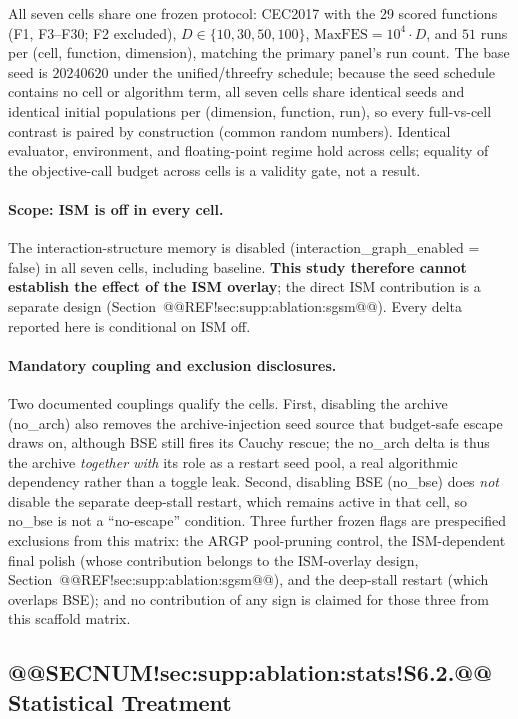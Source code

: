 \documentclass[10pt,a4paper]{article}
\begin{document}
All seven cells share one frozen protocol: CEC2017 with the 29 scored
functions (F1, F3--F30; F2 excluded), $D \in \{10, 30, 50, 100\}$,
$\mathrm{MaxFES} = 10^{4}\cdot D$, and $51$ runs per
(cell, function, dimension), matching the primary panel's run count.  The
base seed is $20240620$ under the unified/threefry schedule; because the seed
schedule contains no cell or algorithm term, all seven cells share identical
seeds and identical initial populations per (dimension, function, run), so
every full-vs-cell contrast is paired by construction (common random
numbers).  Identical evaluator, environment, and floating-point regime hold
across cells; equality of the objective-call budget across cells is a
validity gate, not a result.

\paragraph{Scope: ISM is off in every cell.}
The interaction-structure memory is disabled
(interaction\_graph\_enabled = false) in all seven cells, including
baseline.  \textbf{This study therefore cannot establish the effect
of the ISM overlay}; the direct ISM contribution is a separate design
(Section~@@REF!sec:supp:ablation:sgsm@@).  Every delta reported here is
conditional on ISM off.

\paragraph{Mandatory coupling and exclusion disclosures.}
Two documented couplings qualify the cells.  First, disabling the archive
(no\_arch) also removes the archive-injection seed source that
budget-safe escape draws on, although BSE still fires its Cauchy rescue; the
no\_arch delta is thus the archive \emph{together with} its role as a
restart seed pool, a real algorithmic dependency rather than a toggle leak.
Second, disabling BSE (no\_bse) does \emph{not} disable the separate
deep-stall restart, which remains active in that cell, so no\_bse is
not a ``no-escape'' condition.  Three further frozen flags are prespecified
exclusions from this matrix: the ARGP pool-pruning control, the
ISM-dependent final polish (whose contribution belongs to the ISM-overlay
design, Section~@@REF!sec:supp:ablation:sgsm@@), and the deep-stall restart
(which overlaps BSE); and no contribution of any sign is claimed for those
three from this scaffold matrix.

\subsection{@@SECNUM!sec:supp:ablation:stats!S6.2.@@ Statistical Treatment}\label{sec:supp:ablation:stats}
\end{document}
